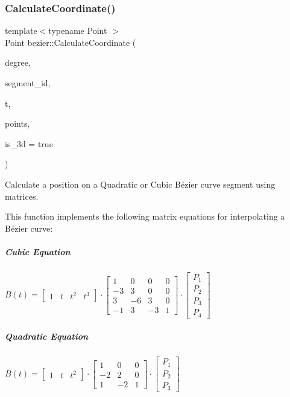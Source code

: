 \subsubsection{\texorpdfstring{Calculate\+Coordinate()}{CalculateCoordinate()}}
{\footnotesize\ttfamily template$<$typename Point $>$ \\
Point bezier\+::\+Calculate\+Coordinate (\begin{DoxyParamCaption}\item[{const \hyperlink{namespacebezier_a175e919883bf10c186c78e5e4aed6a7d}{Bezier\+Degree}}]{degree,  }\item[{const long}]{segment\+\_\+id,  }\item[{const double}]{t,  }\item[{const std\+::vector$<$ Point $>$ \&}]{points,  }\item[{const bool}]{is\+\_\+3d = {\ttfamily true} }\end{DoxyParamCaption})}



Calculate a position on a Quadratic or Cubic Bézier curve segment using matrices. 

This function implements the following matrix equations for interpolating a Bézier curve\+:

\subparagraph*{Cubic Equation}

$ B(t) = \begin{bmatrix} 1 & t & t^2 & t^3 \end{bmatrix} \cdot \begin{bmatrix} 1 & 0 & 0 & 0\\ -3 & 3 & 0 & 0\\ 3 & -6 & 3 & 0\\ -1 & 3 & -3 & 1 \end{bmatrix} \cdot \begin{bmatrix} P_1\\ P_2\\ P_3\\ P_4 \end{bmatrix} $ \subparagraph*{Quadratic Equation}

$ B(t) = \begin{bmatrix} 1 & t & t^2 \end{bmatrix} \cdot \begin{bmatrix} 1 & 0 & 0\\ -2 & 2 & 0\\ 1 & -2 & 1 \end{bmatrix} \cdot \begin{bmatrix} P_1\\ P_2\\ P_3 \end{bmatrix} $


